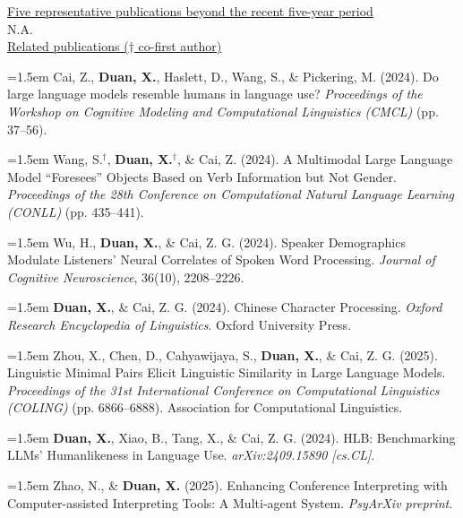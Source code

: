 \documentclass[12pt,a4paper]{article}
\begin{document}
\vspace{\baselineskip}
\underline{Five representative publications beyond the recent five-year period }
\vspace{.5em}\\
N.A.\\

\underline{Related publications (${\dagger}$ co-first author)}
\vspace{.5em}

\hangindent=1.5em  Cai, Z., \textbf{Duan, X.}, Haslett, D., Wang, S., \& Pickering, M. (2024). Do large language models resemble humans in language use? \textit{Proceedings of the Workshop on Cognitive Modeling and Computational Linguistics (CMCL)} (pp. 37–56).

\hangindent=1.5em  Wang, S.$^{\dagger}$, \textbf{Duan, X.$^{\dagger}$}, \& Cai, Z. (2024). A Multimodal Large Language Model “Foresees” Objects Based on Verb Information but Not Gender. \textit{Proceedings of the 28th Conference on Computational Natural Language Learning (CONLL)} (pp. 435–441).

\hangindent=1.5em  Wu, H., \textbf{Duan, X.}, \& Cai, Z. G. (2024). Speaker Demographics Modulate Listeners' Neural Correlates of Spoken Word Processing. \textit{Journal of Cognitive Neuroscience}, 36(10), 2208–2226. 

\hangindent=1.5em  \textbf{Duan, X.}, \& Cai, Z. G. (2024). Chinese Character Processing. \textit{Oxford Research Encyclopedia of Linguistics}. Oxford University Press. 

\hangindent=1.5em  Zhou, X., Chen, D., Cahyawijaya, S., \textbf{Duan, X.}, \& Cai, Z. G. (2025). Linguistic Minimal Pairs Elicit Linguistic Similarity in Large Language Models. \textit{Proceedings of the 31st International Conference on Computational Linguistics (COLING)} (pp. 6866–6888). Association for Computational Linguistics.

\hangindent=1.5em  \textbf{Duan, X.}, Xiao, B., Tang, X., \& Cai, Z. G. (2024). HLB: Benchmarking LLMs' Humanlikeness in Language Use. \textit{arXiv:2409.15890 [cs.CL]}.

\hangindent=1.5em  Zhao, N., \& \textbf{Duan, X.} (2025). Enhancing Conference Interpreting with Computer-assisted Interpreting Tools: A Multi-agent System. \textit{PsyArXiv preprint}.





\vspace{\baselineskip}
\end{document}
